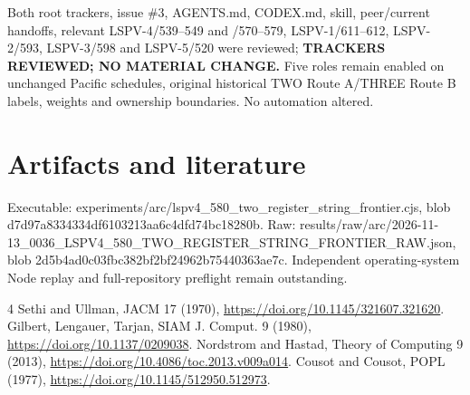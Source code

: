 \documentclass{article}
\begin{document}
Both root trackers, issue \#3, AGENTS.md, CODEX.md, skill, peer/current handoffs, relevant LSPV-4/539--549 and /570--579, LSPV-1/611--612, LSPV-2/593, LSPV-3/598 and LSPV-5/520 were reviewed; \textbf{TRACKERS REVIEWED; NO MATERIAL CHANGE.} Five roles remain enabled on unchanged Pacific schedules, original historical TWO Route A/THREE Route B labels, weights and ownership boundaries. No automation altered.

\section*{Artifacts and literature}
Executable: experiments/arc/lspv4\_580\_two\_register\_string\_frontier.cjs, blob d7d97a8334334df6103213aa6c4dfd74bc18280b. Raw: results/raw/arc/2026-11-13\_0036\_LSPV4\_580\_TWO\_REGISTER\_STRING\_FRONTIER\_RAW.json, blob 2d5b4ad0c03fbc382bf2bf24962b75440363ae7c. Independent operating-system Node replay and full-repository preflight remain outstanding.
\begin{thebibliography}{4}
 Sethi and Ullman, JACM 17 (1970), \url{https://doi.org/10.1145/321607.321620}.
 Gilbert, Lengauer, Tarjan, SIAM J. Comput. 9 (1980), \url{https://doi.org/10.1137/0209038}.
 Nordstrom and Hastad, Theory of Computing 9 (2013), \url{https://doi.org/10.4086/toc.2013.v009a014}.
 Cousot and Cousot, POPL (1977), \url{https://doi.org/10.1145/512950.512973}.
\end{thebibliography}
\end{document}
